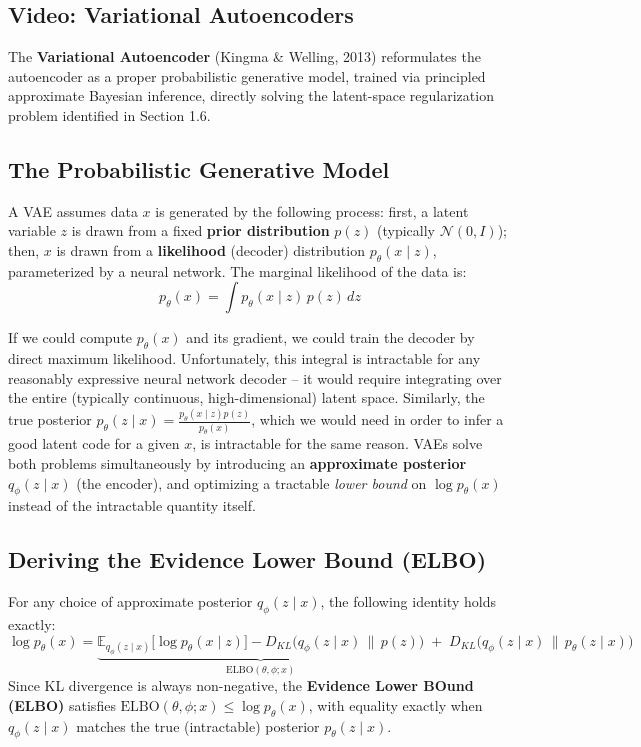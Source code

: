 \documentclass[12pt,a4paper]{article}
\begin{document}
\subsection{Video: Variational Autoencoders}

The \textbf{Variational Autoencoder} (Kingma \& Welling, 2013) reformulates the autoencoder as a proper probabilistic generative model, trained via principled approximate Bayesian inference, directly solving the latent-space regularization problem identified in Section 1.6.

\subsection{The Probabilistic Generative Model}

\begin{defbox}
A VAE assumes data $x$ is generated by the following process: first, a latent variable $z$ is drawn from a fixed \textbf{prior distribution} $p(z)$ (typically $\mathcal{N}(0, I)$); then, $x$ is drawn from a \textbf{likelihood} (decoder) distribution $p_\theta(x \mid z)$, parameterized by a neural network. The marginal likelihood of the data is:
\[
p_\theta(x) = \int p_\theta(x \mid z)\, p(z)\, dz
\]
\end{defbox}

\begin{keyidea}
If we could compute $p_\theta(x)$ and its gradient, we could train the decoder by direct maximum likelihood. Unfortunately, this integral is intractable for any reasonably expressive neural network decoder -- it would require integrating over the entire (typically continuous, high-dimensional) latent space. Similarly, the true posterior $p_\theta(z \mid x) = \frac{p_\theta(x\mid z) p(z)}{p_\theta(x)}$, which we would need in order to infer a good latent code for a given $x$, is intractable for the same reason. VAEs solve both problems simultaneously by introducing an \textbf{approximate posterior} $q_\phi(z\mid x)$ (the encoder), and optimizing a tractable \emph{lower bound} on $\log p_\theta(x)$ instead of the intractable quantity itself.
\end{keyidea}

\subsection{Deriving the Evidence Lower Bound (ELBO)}

\begin{defbox}
For any choice of approximate posterior $q_\phi(z\mid x)$, the following identity holds exactly:
\[
\log p_\theta(x) = \underbrace{\mathbb{E}_{q_\phi(z\mid x)}\big[\log p_\theta(x\mid z)\big] - D_{KL}\big(q_\phi(z\mid x) \,\|\, p(z)\big)}_{\text{ELBO}(\theta,\phi; x)} \;+\; D_{KL}\big(q_\phi(z\mid x) \,\|\, p_\theta(z\mid x)\big)
\]
Since KL divergence is always non-negative, the \textbf{Evidence Lower BOund (ELBO)} satisfies $\text{ELBO}(\theta,\phi;x) \leq \log p_\theta(x)$, with equality exactly when $q_\phi(z\mid x)$ matches the true (intractable) posterior $p_\theta(z\mid x)$.
\end{defbox}
\end{document}
